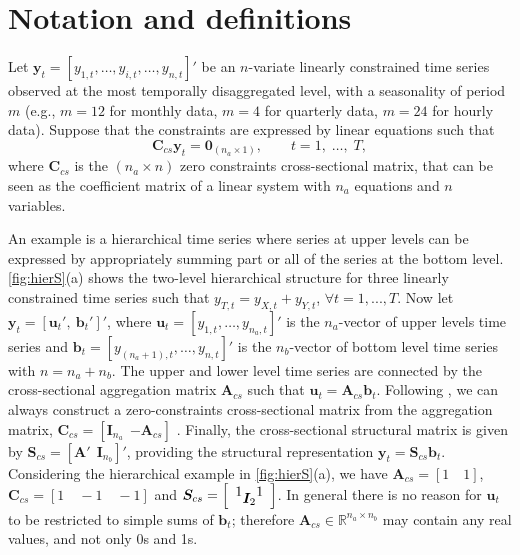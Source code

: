 \documentclass[12pt]{article}
\newcommand{\bvet}{\bm{b}}
\newcommand{\uvet}{\bm{u}}
\newcommand{\yvet}{\bm{y}}
\newcommand{\Avet}{\bm{A}}
\newcommand{\Cvet}{\bm{C}}
\newcommand{\Ivet}{\bm{I}}
\newcommand{\Svet}{\bm{S}}
\newcommand{\Zerovet}{\bm{0}}
\theoremstyle{definition}
\begin{document}
\section{Notation and definitions}\label{sec:not}

Let $\yvet_t = [y_{1,t},\dots,y_{i,t},\dots,y_{n,t}]'$ be an $n$-variate linearly constrained time series observed at the most temporally disaggregated level, with a seasonality of period $m$ (e.g., $m = 12$ for monthly data, $m = 4$ for quarterly data, $m = 24$ for hourly data). Suppose that the constraints are expressed by linear equations such that \citep{difonzo2023}
\begin{equation}
	\label{eq:cs_con}
	\Cvet_{cs}\yvet_t = \Zerovet_{(n_a \times 1)}, \qquad t = 1, \;\dots, \;T,
\end{equation}
where $\Cvet_{cs}$ is the $(n_a \times n)$ zero constraints cross-sectional matrix, that can be seen as the coefficient matrix of a linear system with $n_a$ equations and $n$ variables.



An example is a hierarchical time series where series at upper levels can be expressed by appropriately summing part or all of the series at the bottom level. \autoref{fig:hierS}(a) shows the two-level hierarchical structure for three linearly constrained time series such that $y_{T,t} = y_{X,t} + y_{Y,t}$, $\forall t = 1,...,T$. Now let $\yvet_t = [\uvet_t',~ \bvet_t']'$, where $\uvet_t = [y_{1,t}, \dots, y_{n_a,t}]'$ is the $n_a$-vector of upper levels time series and $\bvet_t = [y_{(n_a+1),t}, \dots, y_{n,t}]'$ is the $n_b$-vector of bottom level time series with $n = n_a+n_b$. The upper and lower level time series are connected by the cross-sectional aggregation matrix $\Avet_{cs}$ such that $\uvet_t = \Avet_{cs}\bvet_t$. Following \cite{giro2022}, we can always construct a zero-constraints cross-sectional matrix from the aggregation matrix, $\Cvet_{cs}=[\Ivet_{n_a} ~~ {-\Avet_{cs}}]$ . Finally, the cross-sectional structural matrix is given by $\Svet_{cs} = [\Avet' ~~ \Ivet_{n_b}]'$, providing the structural representation \citep{hyndman2011} $\yvet_t = \Svet_{cs} \bvet_t$. Considering the hierarchical example in \autoref{fig:hierS}(a), we have $\Avet_{cs} = \left[ 1 \quad 1 \right]$, $\Cvet_{cs} = \left[ 1 \quad -1\quad -1 \right]$ and $\Svet_{cs} = \left[\begin{array}{cc} 1 & 1 \\[-0.25cm] \multicolumn{2}{c}{\Ivet_2} \end{array}\right]$. In general there is no reason for $\uvet_t$ to be restricted to simple sums of $\bvet_t$; therefore $\Avet_{cs} \in \mathbb{R}^{n_a\times n_b}$ may contain any real values, and not only 0s and 1s.
\end{document}
